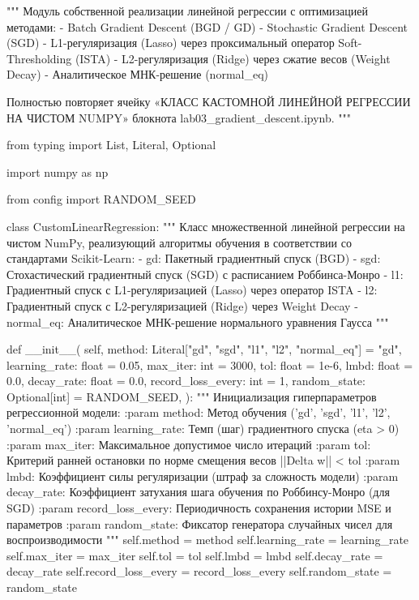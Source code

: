 \documentclass[14pt,a4paper]{extarticle}
\begin{document}
\begin{CodeListing}
"""
Модуль собственной реализации линейной регрессии с оптимизацией методами:
- Batch Gradient Descent (BGD / GD)
- Stochastic Gradient Descent (SGD)
- L1-регуляризация (Lasso) через проксимальный оператор Soft-Thresholding (ISTA)
- L2-регуляризация (Ridge) через сжатие весов (Weight Decay)
- Аналитическое МНК-решение (normal_eq)

Полностью повторяет ячейку «КЛАСС КАСТОМНОЙ ЛИНЕЙНОЙ РЕГРЕССИИ НА ЧИСТОМ NUMPY»
блокнота lab03_gradient_descent.ipynb.
"""

from typing import List, Literal, Optional

import numpy as np

from config import RANDOM_SEED


class CustomLinearRegression:
    """
    Класс множественной линейной регрессии на чистом NumPy,
    реализующий алгоритмы обучения в соответствии со стандартами Scikit-Learn:
    - gd: Пакетный градиентный спуск (BGD)
    - sgd: Стохастический градиентный спуск (SGD) с расписанием Роббинса-Монро
    - l1: Градиентный спуск с L1-регуляризацией (Lasso) через оператор ISTA
    - l2: Градиентный спуск с L2-регуляризацией (Ridge) через Weight Decay
    - normal_eq: Аналитическое МНК-решение нормального уравнения Гаусса
    """

    def __init__(
        self,
        method: Literal["gd", "sgd", "l1", "l2", "normal_eq"] = "gd",
        learning_rate: float = 0.05,
        max_iter: int = 3000,
        tol: float = 1e-6,
        lmbd: float = 0.0,
        decay_rate: float = 0.0,
        record_loss_every: int = 1,
        random_state: Optional[int] = RANDOM_SEED,
    ):
        """
        Инициализация гиперпараметров регрессионной модели:
        :param method: Метод обучения ('gd', 'sgd', 'l1', 'l2', 'normal_eq')
        :param learning_rate: Темп (шаг) градиентного спуска (eta > 0)
        :param max_iter: Максимальное допустимое число итераций
        :param tol: Критерий ранней остановки по норме смещения весов ||Delta w|| < tol
        :param lmbd: Коэффициент силы регуляризации (штраф за сложность модели)
        :param decay_rate: Коэффициент затухания шага обучения по Роббинсу-Монро (для SGD)
        :param record_loss_every: Периодичность сохранения истории MSE и параметров
        :param random_state: Фиксатор генератора случайных чисел для воспроизводимости
        """
        self.method = method
        self.learning_rate = learning_rate
        self.max_iter = max_iter
        self.tol = tol
        self.lmbd = lmbd
        self.decay_rate = decay_rate
        self.record_loss_every = record_loss_every
        self.random_state = random_state


\end{CodeListing}
\end{document}
